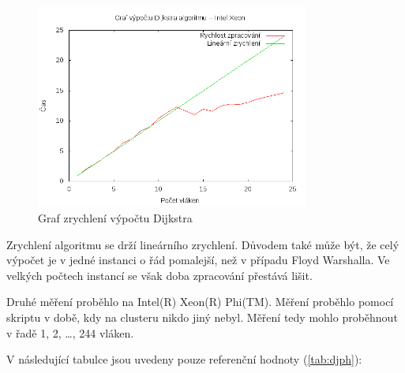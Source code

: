\documentclass[10pt,a4paper]{article}
\begin{document}
\begin{figure}[H]
  \centering
    \includegraphics[width=0.8\textwidth]{graf_dijkstra_intel.png}
  \caption{Graf zrychlení výpočtu Dijkstra}
  \label{fig:dijk}
\end{figure}

Zrychlení algoritmu se drží lineárního zrychlení. Důvodem také může být, že celý výpočet je v jedné instanci o řád pomalejší, než v případu Floyd Warshalla. Ve velkých počtech instancí se však doba zpracování přestává lišit.

Druhé měření proběhlo na Intel(R) Xeon(R) Phi(TM). Měření proběhlo pomocí skriptu v době, kdy na clusteru nikdo jiný nebyl. Měření tedy mohlo proběhnout v řadě 1, 2, \dots , 244 vláken.

V následující tabulce jsou uvedeny pouze referenční hodnoty (\ref{tab:djph}):
\end{document}
